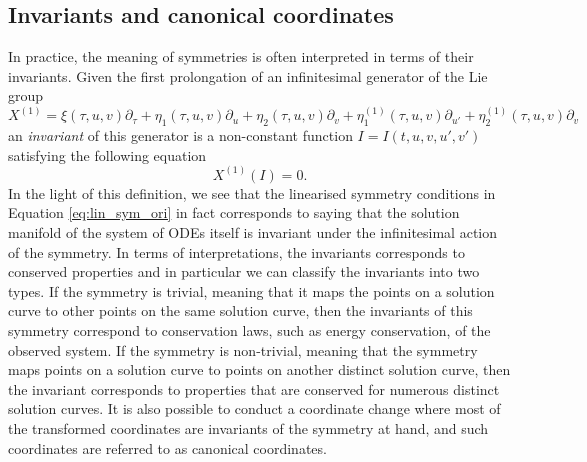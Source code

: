 \subsection{Invariants and canonical coordinates}
In practice, the meaning of symmetries is often interpreted in terms of their invariants. Given the first prolongation of an infinitesimal generator of the Lie group
$$X^{(1)}=\xi(\tau,u,v)\partial_\tau+\eta_1(\tau,u,v)\partial_u+\eta_2(\tau,u,v)\partial_v+\eta_{1}^{(1)}(\tau,u,v)\partial_{u'}+\eta_{2}^{(1)}(\tau,u,v)\partial_{v}$$
an \textit{invariant} of this generator is a non-constant function $I=I(t,u,v,u',v')$ satisfying the following equation
\begin{equation}
  X^{(1)}\left(I\right)=0.
  \label{eq:invariant}
\end{equation}
In the light of this definition, we see that the linearised symmetry conditions in Equation \eqref{eq:lin_sym_ori} in fact corresponds to saying that the solution manifold of the system of ODEs itself is invariant under the infinitesimal action of the symmetry. In terms of interpretations, the invariants corresponds to conserved properties and in particular we can classify the invariants into two types. If the symmetry is trivial, meaning that it maps the points on a solution curve to other points on the same solution curve, then the invariants of this symmetry correspond to conservation laws, such as energy conservation, of the observed system. If the symmetry is non-trivial, meaning that the symmetry maps points on a solution curve to points on another distinct solution curve, then the invariant corresponds to properties that are conserved for numerous distinct solution curves. It is also possible to conduct a coordinate change where most of the transformed coordinates are invariants of the symmetry at hand, and such coordinates are referred to as canonical coordinates.

